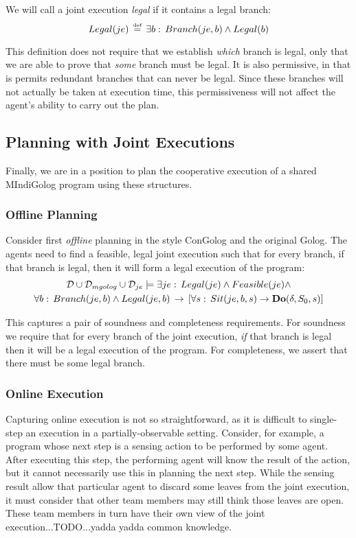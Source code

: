 We will call a joint execution \emph{legal} if it contains a legal
branch:\[
Legal(je)\,\stackrel{\mbox{\tiny def}}{=}\,\exists b:\, Branch(je,b)\wedge Legal(b)\]


This definition does not require that we establish \emph{which} branch
is legal, only that we are able to prove that \emph{some} branch must
be legal. It is also permissive, in that is permits redundant branches
that can never be legal. Since these branches will not actually be
taken at execution time, this permissiveness will not affect the agent's
ability to carry out the plan.


\subsection{Planning with Joint Executions}

Finally, we are in a position to plan the cooperative execution of
a shared MIndiGolog program using these structures.


\subsubsection{Offline Planning}

Consider first \emph{offline} planning in the style ConGolog and the
original Golog. The agents need to find a feasible, legal joint execution
such that for every branch, if that branch is legal, then it will
form a legal execution of the program:\begin{multline*}
\mathcal{D}\cup\mathcal{D}_{mgolog}\cup\mathcal{D}_{je}\models\exists je:\, Legal(je)\wedge Feasible(je)\wedge\\
\forall b:\, Branch(je,b)\wedge Legal(je,b)\,\rightarrow\,\left[\forall s:\, Sit(je,b,s)\rightarrow\mathbf{Do}(\delta,S_{0},s)\right]\end{multline*}


This captures a pair of soundness and completeness requirements. For
soundness we require that for every branch of the joint execution,
\emph{if} that branch is legal then it will be a legal execution of
the program. For completeness, we assert that there must be some legal
branch.


\subsubsection{Online Execution}

Capturing online execution is not so straightforward, as it is difficult
to single-step an execution in a partially-observable setting. Consider,
for example, a program whose next step is a sensing action to be performed
by some agent. After executing this step, the performing agent will
know the result of the action, but it cannot necessarily use this
in planning the next step. While the sensing result allow that particular
agent to discard some leaves from the joint execution, it must consider
that other team members may still think those leaves are open. These
team members in turn have their own view of the joint execution...TODO...yadda
yadda common knowledge.

